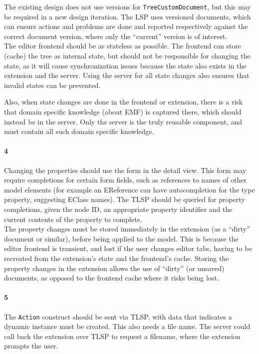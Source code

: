 The existing design does not use versions for \texttt{TreeCustomDocument}, but this may be required in a new design iteration.
The \acrshort{LSP} uses versioned documents, which can ensure actions and problems are done and reported respectively against the correct document version, where only the ``current'' version is of interest.\\

The editor frontend should be as stateless as possible.
The frontend can store (cache) the tree as internal state, but should not be responsible for changing the state, as it will cause synchronization issues because the state also exists in the extension and the server.
Using the server for all state changes also ensures that invalid states can be prevented.

Also, when state changes are done in the frontend or extension, there is a risk that domain specific knowledge (about \acrshort{EMF}) is captured there, which should instead be in the server.
Only the server is the truly reusable component, and must contain all such domain specific knowledge.


\paragraph{4} Changing the properties should use the form in the detail view.
This form may require completions for certain form fields, such as references to names of other model elements (for example an EReference can have autocompletion for the type property, suggesting EClass names).
The \acrshort{TLSP} should be queried for property completions, given the node ID, an appropriate property identifier and the current contents of the property to complete.\\

The property changes must be stored immediately in the extension (as a ``dirty'' document or similar), before being applied to the model.
This is because the editor frontend is transient, and lost if the user changes editor tabs, having to be recreated from the extension's state and the frontend's cache.
Storing the property changes in the extension allows the use of ``dirty'' (or unsaved) documents, as opposed to the frontend cache where it risks being lost.

\paragraph{5} The \texttt{Action} construct should be sent via \acrshort{TLSP}, with data that indicates a dynamic instance must be created.
This also needs a file name.
The server could call back the extension over \acrshort{TLSP} to request a filename, where the extension prompts the user.


